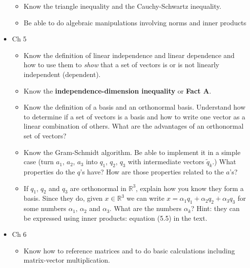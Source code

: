 \documentclass[11pt,fleqn]{article}
\newcommand{\Reals}{\mathbb{R}}
\begin{document}
\begin{itemize}
\begin{itemize}
		\item Know the triangle inequality and the Cauchy-Schwartz inequality.
		\item Be able to do algebraic manipulations involving norms and inner products
		\end{itemize}
	\item Ch 5
		\begin{itemize}
		\item Know the definition of linear independence and linear dependence and how to use them to \emph{show} that a set of vectors is or is not linearly independent (dependent).
		\item Know the \textbf{independence-dimension inequality} or \textbf{Fact A}.
		\item Know the definition of a basis and an orthonormal basis. Understand how to determine if a set of vectors is a basis and how to write one vector as a linear combination of others. What are the advantages of an orthonormal set of vectors?
		\item Know the Gram-Schmidt algorithm.  Be able to implement it in a simple case
(turn $a_1$, $a_2$, $a_3$ into $q_1$, $q_2$, $q_3$ with intermediate vectors
$\tilde q_k$.)  What properties do the $q$'s have? How are those properties related to the $a$'s?
		\item If $q_1$, $q_2$ and $q_3$ are orthonormal in $\Reals^3$, explain how you know they form a basis.  Since they do, given
$x\in\Reals^3$ we can write $x = \alpha_1 q_1+\alpha_2 q_2+ \alpha_3 q_3$
for some numbers $\alpha_1$, $\alpha_2$ and $\alpha_3$.  What are the numbers
$\alpha_k$?  Hint: they can be expressed using inner products: equation (5.5) in the text.
		\end{itemize}
	\item Ch 6
		\begin{itemize}
		\item Know how to reference matrices and to do basic calculations including matrix-vector multiplication.
		\end{itemize}


\end{itemize}
\end{document}
